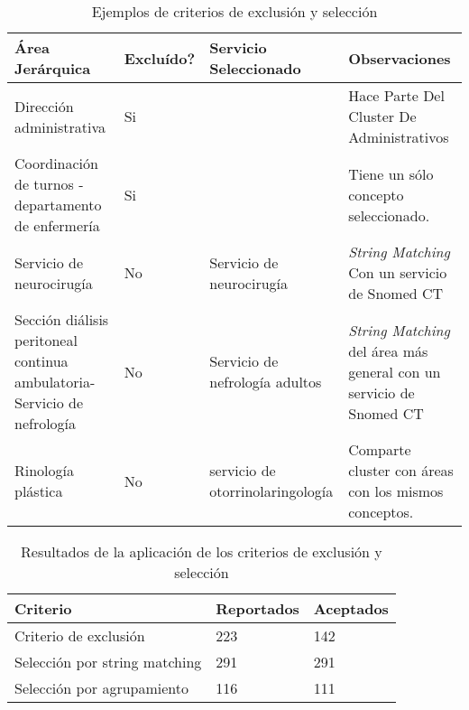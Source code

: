 \begin{table}[htb]
\centering
\caption{Ejemplos de criterios de exclusión y selección}
\label{ejemploCriterios}
\begin{tabularx}{\textwidth}{@{}XlXX@{}}
\toprule
Área Jerárquica                                                          & Excluído? & Servicio Seleccionado            & Observaciones                                                     \\ \midrule
Dirección administrativa                                                 & Si        &                                  & Hace Parte Del Cluster De Administrativos                         \\
Coordinación de turnos - departamento de enfermería                      & Si        &                                  & Tiene un sólo concepto seleccionado.                              \\
Servicio de neurocirugía                                                 & No        & Servicio de neurocirugía         & \textit{String Matching} Con un servicio de Snomed CT                      \\
Sección diálisis peritoneal continua ambulatoria- Servicio de nefrología & No        & Servicio de nefrología adultos   & \textit{String Matching} del área más general con un servicio de Snomed CT \\
Rinología plástica                                                       & No        & servicio de otorrinolaringología & Comparte cluster con áreas con los mismos conceptos.              \\ \bottomrule
\end{tabularx}
\end{table}

\begin{table}[htb]
\centering
\caption{Resultados de la aplicación de los criterios de exclusión y selección}
\label{resultadosCriterios}
\begin{tabular}{@{}lll@{}}
\toprule
Criterio                      & Reportados & Aceptados \\ \midrule
Criterio de exclusión         & 223        & 142       \\
Selección por string matching & 291        & 291       \\
Selección por agrupamiento    & 116        & 111       \\ \bottomrule
\end{tabular}
\end{table}

